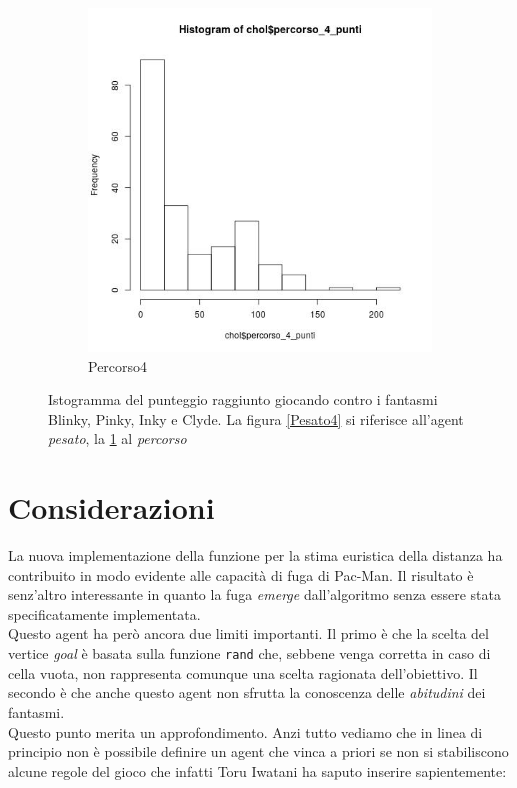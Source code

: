 \documentclass[8pt]{book}
\begin{document}
\begin{figure}
\begin{subfigure}[b]{0.49\textwidth}
    \includegraphics[width=\textwidth]{img/percorso_4_punteggio.png}
    \caption{Percorso4}
    \label{Percorso4}
  \end{subfigure}
  \caption{Istogramma del punteggio raggiunto giocando contro  i fantasmi Blinky, Pinky, Inky e Clyde. La figura \ref{Pesato4} si riferisce all'agent \emph{pesato}, la \ref{Percorso4} al \emph{percorso}}
  \label{pesatoPercorso4}
\end{figure}



\section{Considerazioni}\label{tocux5f94}

La nuova implementazione della funzione per la stima euristica della distanza ha contribuito in modo evidente alle capacità di fuga di Pac-Man. Il risultato è senz'altro interessante in quanto la fuga \emph{emerge} dall'algoritmo senza essere stata specificatamente implementata.\\
Questo agent ha però ancora due limiti importanti. Il primo è che la scelta del vertice \emph{goal} è basata sulla funzione \texttt{rand} che, sebbene venga corretta in caso di cella vuota, non rappresenta comunque una scelta ragionata dell'obiettivo. Il secondo è che anche questo agent non sfrutta la conoscenza delle \emph{abitudini} dei fantasmi.\\
Questo punto merita un approfondimento. Anzi tutto vediamo che in linea di principio non è possibile definire un agent che vinca a priori se non si stabiliscono alcune regole del gioco che infatti Toru Iwatani ha saputo inserire sapientemente:
\end{document}
